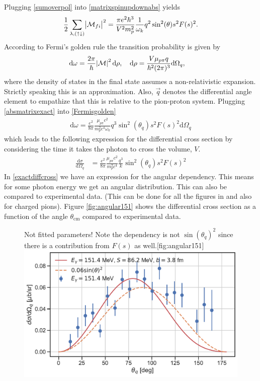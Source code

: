 Plugging \eqref{sumoverpol} into \eqref{matrixspinupdownabs} yields
\begin{equation} \label{absmatrixexact}
    \frac{1}{2}\sum_{\lambda,(\uparrow\downarrow)} \abs{\mathcal{M}_{fi}}^2 = \frac{\pi e^2\hbar^3}{V^2 m_p^2}\frac{1}{\omega_k} q^2\sin^2(\theta) s^2 F(s)^2.
\end{equation}
According to Fermi's golden rule the transition probability is given by
\begin{align}\label{Fermisgolden}
    \text{d}\omega &= \frac{2\pi}{\hbar}\abs{\mathcal{M}}^2\text{d}\rho, \quad \text{d}\rho = \frac{V \mu_{p\pi }q}{\hbar^2(2\pi)^3}\text{d}\Omega_q,
\end{align}
where the density of states in the final state assumes a non-relativistic expansion. Strictly speaking this is an approximation. Also, $\vec{q}$ denotes the differential angle element to empathize that this is relative to the pion-proton system. Plugging \eqref{absmatrixexact} into \eqref{Fermisgolden}
\begin{align}
    \text{d}\omega = \frac{e^2}{8\pi}\frac{\mu_{p\pi }c^2}{m_p^2 c^4 \omega_k}q^3 \sin^2(\theta_q) s^2 F(s)^2 \text{d}\Omega_q
\end{align}
which leads to the following expression for the differential cross section by considering the time it takes the photon to cross the volume, $V$.
\begin{align}\label{exactdiffcross}
    \frac{\text{d}\sigma}{\text{d}\Omega_q} &= \frac{e^2}{8\pi}\frac{\mu_{p\pi}c^2}{m_p^2c^4}\frac{q^3}{k}\sin^2(\theta_q) s^2 F(s)^2
\end{align}
In \eqref{exactdiffcross} we have an expression for the angular dependency. This means for some photon energy we get an angular distribution. This can also be compared to experimental data. (This can be done for all the figures in \cite{Beck_1990} and also for charged pions). Figure \ref{fig:angular151} shows the differential cross section as a function of the angle $\theta_{\text{cm}}$ compared to experimental data.  
\begin{figure}[H]
    \begin{sidecaption}{Not fitted parameters! Note the dependency is not $\sin(\theta_q)^2$ since there is a contribution from $F(s)$ as well.}[fig:angular151]
    \includegraphics[width=\linewidth]{Figures/DiffCross151.pdf}
    \end{sidecaption}
\end{figure}

